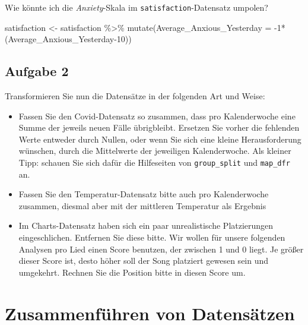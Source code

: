\documentclass[
]{book}
\newenvironment{Shaded}{\begin{snugshade}}{\end{snugshade}}
\newcommand{\AttributeTok}[1]{\textcolor[rgb]{0.77,0.63,0.00}{#1}}
\newcommand{\DecValTok}[1]{\textcolor[rgb]{0.00,0.00,0.81}{#1}}
\newcommand{\FunctionTok}[1]{\textcolor[rgb]{0.00,0.00,0.00}{#1}}
\newcommand{\NormalTok}[1]{#1}
\newcommand{\OtherTok}[1]{\textcolor[rgb]{0.56,0.35,0.01}{#1}}
\newcommand{\SpecialCharTok}[1]{\textcolor[rgb]{0.00,0.00,0.00}{#1}}
\begin{document}
Wie könnte ich die \emph{Anxiety}-Skala im \texttt{satisfaction}-Datensatz umpolen?

\begin{Shaded}
\begin{Highlighting}[]
\NormalTok{satisfaction }\OtherTok{\textless{}{-}}\NormalTok{ satisfaction }\SpecialCharTok{\%\textgreater{}\%} 
  \FunctionTok{mutate}\NormalTok{(}\AttributeTok{Average\_Anxious\_Yesterday =} \SpecialCharTok{{-}}\DecValTok{1}\SpecialCharTok{*}\NormalTok{ (Average\_Anxious\_Yesterday}\DecValTok{{-}10}\NormalTok{))}
\end{Highlighting}
\end{Shaded}

\hypertarget{aufgabe-2-1}{%
\subsection{Aufgabe 2}\label{aufgabe-2-1}}

Transformieren Sie nun die Datensätze in der folgenden Art und Weise:

\begin{itemize}
\item
  Fassen Sie den Covid-Datensatz so zusammen, dass pro Kalenderwoche eine Summe der jeweils neuen Fälle übrigbleibt. Ersetzen Sie vorher die fehlenden Werte entweder durch Nullen, oder wenn Sie sich eine kleine Herausforderung wünschen, durch die Mittelwerte der jeweiligen Kalenderwoche. Als kleiner Tipp: schauen Sie sich dafür die Hilfeseiten von \texttt{group\_split} und \texttt{map\_dfr} an.
\item
  Fassen Sie den Temperatur-Datensatz bitte auch pro Kalenderwoche zusammen, diesmal aber mit der mittleren Temperatur als Ergebnis
\item
  Im Charts-Datensatz haben sich ein paar unrealistische Platzierungen eingeschlichen. Entfernen Sie diese bitte. Wir wollen für unsere folgenden Analysen pro Lied einen Score benutzen, der zwischen 1 und 0 liegt. Je größer dieser Score ist, desto höher soll der Song platziert gewesen sein und umgekehrt. Rechnen Sie die Position bitte in diesen Score um.
\end{itemize}

\hypertarget{zusammenfuxfchren-von-datensuxe4tzen}{%
\section{Zusammenführen von Datensätzen}\label{zusammenfuxfchren-von-datensuxe4tzen}}
\end{document}
